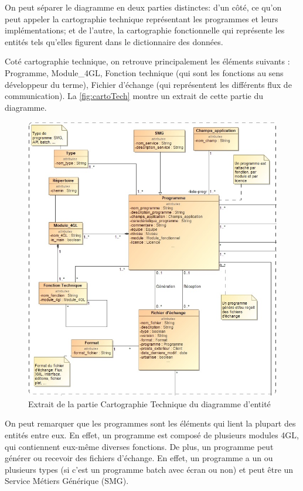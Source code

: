 \documentclass{polytech/polytech}
\begin{document}
On peut séparer le diagramme en deux parties distinctes: d'un côté, ce qu'on peut appeler la cartographie technique représentant les programmes et leurs implémentations; et de l'autre, la cartographie fonctionnelle qui représente les entités tels qu'elles figurent dans le dictionnaire des données.

Coté cartographie technique, on retrouve principalement les éléments suivants : Programme, Module\_4GL, Fonction technique (qui sont les fonctions au sens développeur du terme), Fichier d'échange (qui représentent les différents flux de communication). La \autoref{fig:cartoTech} montre un extrait de cette partie du diagramme.

\begin{figure}
	\includegraphics[scale=0.6]{images/diagCarto}
	\caption{Extrait de la partie Cartographie Technique du diagramme d'entité}
	\label{fig:cartoTech}
\end{figure}

On peut remarquer que les programmes sont les éléments qui lient la plupart des entités entre eux. En effet, un programme est composé de plusieurs modules 4GL, qui contiennent eux-même diverses fonctions. De plus, un programme peut générer ou recevoir des fichiers d'échange. En effet, un programme a un ou plusieurs types (si c'est un programme batch avec écran ou non) et peut être un Service Métiers Générique (SMG). 
\end{document}
